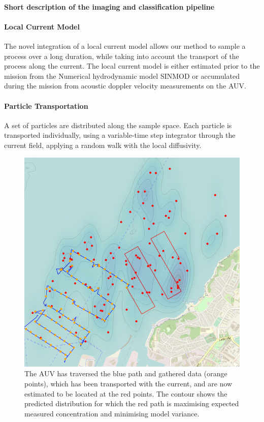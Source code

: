 \documentclass[conference]{IEEEtran}
\begin{document}
\paragraph{Short description of the imaging and classification pipeline}

\paragraph{Local Current Model}
The novel integration of a local current model allows our method to sample a process over a long duration, while taking into account the transport of the process along the current.
The local current model is either estimated prior to the mission from the Numerical hydrodynamic model SINMOD or accumulated during the mission from acoustic doppler velocity measurements on the AUV.
\paragraph{Particle Transportation}
A set of particles are distributed along the sample space.  
Each particle is transported individually, using a variable-time step integrator through the current field, applying a random walk with the local diffusivity.
\begin{figure}[tbp]
\centerline{\includegraphics[width=\linewidth]{figures/munkholmen_planned_path.png}}
\caption{The AUV has traversed the blue path and gathered data (orange points), which has been transported with the current, and are now estimated to be located at the red points.
The contour shows the predicted distribution for which the red path is maximising expected measured concentration and minimising model variance.}
\label{fig:munkholmen}
\end{figure}
\end{document}
